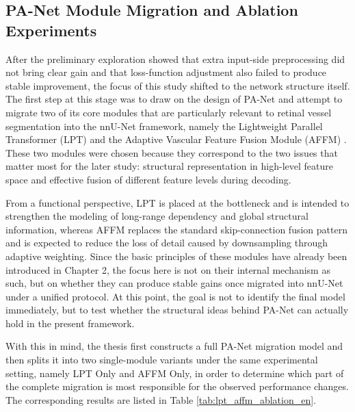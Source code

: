 \documentclass[a4paper,11pt]{article}
\begin{document}
\subsection{PA-Net Module Migration and Ablation Experiments}
After the preliminary exploration showed that extra input-side preprocessing did not bring clear gain and that loss-function adjustment also failed to produce stable improvement, the focus of this study shifted to the network structure itself. The first step at this stage was to draw on the design of PA-Net and attempt to migrate two of its core modules that are particularly relevant to retinal vessel segmentation into the nnU-Net framework, namely the Lightweight Parallel Transformer (LPT) and the Adaptive Vascular Feature Fusion Module (AFFM) \cite{luo2025panet}. These two modules were chosen because they correspond to the two issues that matter most for the later study: structural representation in high-level feature space and effective fusion of different feature levels during decoding.

From a functional perspective, LPT is placed at the bottleneck and is intended to strengthen the modeling of long-range dependency and global structural information, whereas AFFM replaces the standard skip-connection fusion pattern and is expected to reduce the loss of detail caused by downsampling through adaptive weighting. Since the basic principles of these modules have already been introduced in Chapter 2, the focus here is not on their internal mechanism as such, but on whether they can produce stable gains once migrated into nnU-Net under a unified protocol. At this point, the goal is not to identify the final model immediately, but to test whether the structural ideas behind PA-Net can actually hold in the present framework.

With this in mind, the thesis first constructs a full PA-Net migration model and then splits it into two single-module variants under the same experimental setting, namely LPT Only and AFFM Only, in order to determine which part of the complete migration is most responsible for the observed performance changes. The corresponding results are listed in Table \ref{tab:lpt_affm_ablation_en}.
\end{document}
